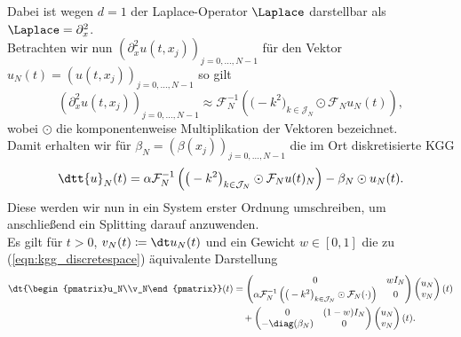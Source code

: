 Dabei ist wegen $d=1$ der Laplace-Operator $\Laplace$ darstellbar als $\Laplace=\partial^2_x$.\\
Betrachten wir nun $(\partial^2_x u(t,x_j))_{j=0,\dots,N-1}$ für den Vektor $u_N(t)=(u(t,x_j))_{j=0,\dots,N-1}$ so gilt
\[(\partial^2_x u(t,x_j))_{j=0,\dots,N-1}\approx \mathcal{F}_N^{-1}\left(\big(-k^2\big)_{k\in\mathcal{J}_N}\odot\mathcal{F}_Nu_N(t)\right),\]
wobei $\odot$ die komponentenweise Multiplikation der Vektoren bezeichnet.\\
Damit erhalten wir für $\beta_N=(\beta(x_j))_{j=0,\dots,N-1}$ die im Ort diskretisierte KGG
\begin{equation}
\label{eqn:kgg_discretespace}
\dtt{u}_N(t)=\alpha \mathcal{F}_N^{-1}\left(\big(-k^2\big)_{k\in\mathcal{J}_N}\odot\mathcal{F}_Nu(t)_N\right) -\beta_N\odot u_N(t).
\end{equation}
Diese werden wir nun in ein System erster Ordnung umschreiben, um anschließend ein Splitting darauf anzuwenden.\\
Es gilt für $t>0$, $v_N(t)\coloneqq \dt u_N(t)$ und ein Gewicht $w\in [0,1]$ die zu (\ref{eqn:kgg_discretespace}) äquivalente Darstellung
\begin{align}
\label{eqn:kgg_discrete_first_order_part1}
\dt{\begin{pmatrix}u_N\\v_N\end{pmatrix}}(t)&=
\begin{pmatrix}0 & wI_N\\ \alpha\mathcal{F}_N^{-1}\left(\big(-k^2\big)_{k\in\mathcal{J}_N}\odot\mathcal{F}_N (\cdot )\right) & 0\end{pmatrix}
\begin{pmatrix}u_N\\v_N\end{pmatrix}(t)\\
\label{eqn:kgg_discrete_first_order_part2}
&\quad+\begin{pmatrix}0 & (1-w)I_N\\ -\diag({\beta_N}) & 0\end{pmatrix}
\begin{pmatrix}u_N\\v_N\end{pmatrix}(t).
\end{align}

